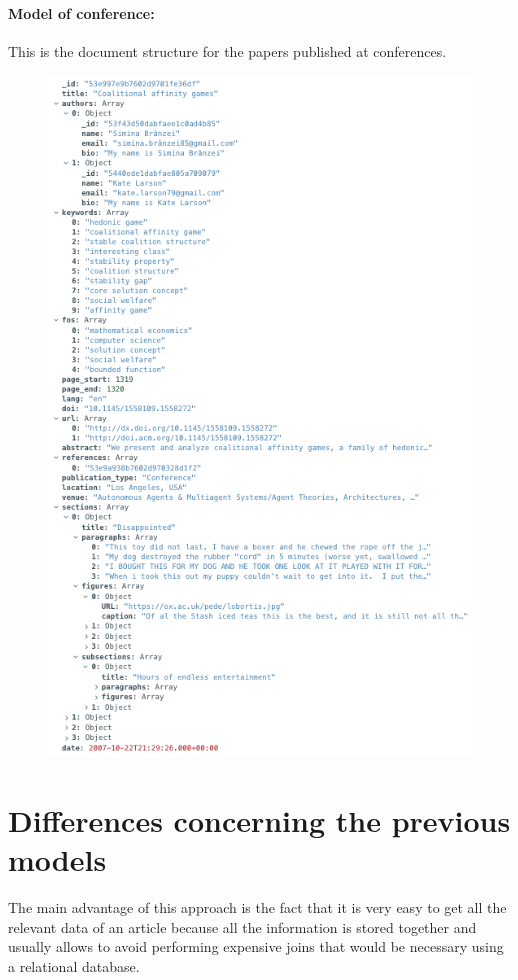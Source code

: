 \paragraph{Model of conference:}
This is the document structure for the papers published at conferences.
\begin{figure}[H]
    \begin{center}
        \includegraphics[width=0.9\linewidth]{ImagesMongoDB/conference}
        \label{fig:conference}%
    \end{center}
\end{figure}


\section{Differences concerning the previous models}
\label{sec:differences_concerning_the_previous_models}%
The main advantage of this approach is the fact that it is very easy to get all the relevant data of an article because all the information is stored together and usually allows to avoid performing expensive joins that would be necessary using a relational database.

